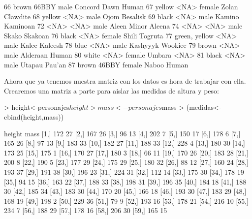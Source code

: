 \documentclass [a4paper] {article}
\begin{document}
\begin{Schunk}
\begin{Soutput}
66         brown      66BBY          male   Concord Dawn          Human
67        yellow       <NA>        female          Zolan       Clawdite
68        yellow       <NA>          male           Ojom       Besalisk
69         black       <NA>          male         Kamino       Kaminoan
72          <NA>       <NA>          male    Aleen Minor         Aleena
74          <NA>       <NA>          male          Skako        Skakoan
76         black       <NA>        female          Shili        Togruta
77 green, yellow       <NA>          male          Kalee        Kaleesh
78          blue       <NA>          male       Kashyyyk        Wookiee
79         brown       <NA>          male       Alderaan          Human
80         white       <NA>        female         Umbara           <NA>
81         black       <NA>          male         Utapau         Pau'an
87         brown      46BBY        female          Naboo          Human
\end{Soutput}
\end{Schunk}

Ahora que ya tenemos nuestra matriz con los datos es hora de trabajar con ella. Crearemos una matriz a parte para aislar las 
medidas de altura y peso:

\begin{Schunk}
\begin{Sinput}
> height<-personajes$height
> mass<-personajes$mass
> (medidas<-cbind(height,mass))
\end{Sinput}
\begin{Soutput}
      height mass
 [1,]    172   27
 [2,]    167   26
 [3,]     96   13
 [4,]    202    7
 [5,]    150   17
 [6,]    178    6
 [7,]    165   26
 [8,]     97   13
 [9,]    183   33
[10,]    182   27
[11,]    188   33
[12,]    228    4
[13,]    180   30
[14,]    173   25
[15,]    175    1
[16,]    170   27
[17,]    180    3
[18,]     66   11
[19,]    170   26
[20,]    183   28
[21,]    200    8
[22,]    190    5
[23,]    177   29
[24,]    175   29
[25,]    180   32
[26,]     88   12
[27,]    160   24
[28,]    193   37
[29,]    191   38
[30,]    196   23
[31,]    224   31
[32,]    112   14
[33,]    175   30
[34,]    178   19
[35,]     94   15
[36,]    163   22
[37,]    188   33
[38,]    198   31
[39,]    196   35
[40,]    184   18
[41,]    188   30
[42,]    185   34
[43,]    183   30
[44,]    170   20
[45,]    166   18
[46,]    193   30
[47,]    183   29
[48,]    168   19
[49,]    198    2
[50,]    229   36
[51,]     79    9
[52,]    193   16
[53,]    178   21
[54,]    216   10
[55,]    234    7
[56,]    188   29
[57,]    178   16
[58,]    206   30
[59,]    165   15
\end{Soutput}
\end{Schunk}
\end{document}
